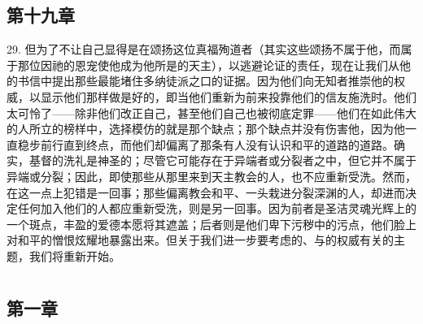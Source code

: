 
\subsection{第十九章}

29. 但为了不让自己显得是在颂扬这位真福殉道者（其实这些颂扬不属于他，而属于那位因祂的恩宠使他成为他所是的天主），以逃避论证的责任，现在让我们从他的书信中提出那些最能堵住多纳徒派之口的证据。因为他们向无知者推崇他的权威，以显示他们那样做是好的，即当他们重新为前来投靠他们的信友施洗时。他们太可怜了——除非他们改正自己，甚至他们自己也被彻底定罪——他们在如此伟大的人所立的榜样中，选择模仿的就是那个缺点；那个缺点并没有伤害他，因为他一直稳步前行直到终点，而他们却偏离了那条有人没有认识和平的道路的道路。确实，基督的洗礼是神圣的；尽管它可能存在于异端者或分裂者之中，但它并不属于异端或分裂；因此，即使那些从那里来到天主教会的人，也不应重新受洗。然而，在这一点上犯错是一回事；那些偏离教会和平、一头栽进分裂深渊的人，却进而决定任何加入他们的人都应重新受洗，则是另一回事。因为前者是圣洁灵魂光辉上的一个斑点，丰盈的爱德本愿将其遮盖；后者则是他们卑下污秽中的污点，他们脸上对和平的憎恨炫耀地暴露出来。但关于我们进一步要考虑的、与的权威有关的主题，我们将重新开始。\par



\section{}

\par


\subsection{第一章}


